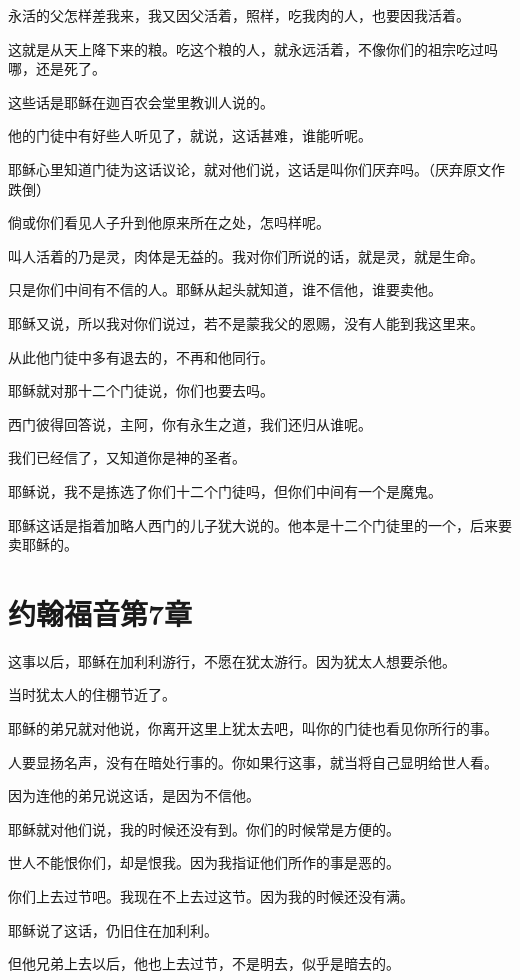 \documentclass[12pt,oneside]{book}
\begin{document}
永活的父怎样差我来，我又因父活着，照样，吃我肉的人，也要因我活着。

这就是从天上降下来的粮。吃这个粮的人，就永远活着，不像你们的祖宗吃过吗哪，还是死了。

这些话是耶稣在迦百农会堂里教训人说的。

他的门徒中有好些人听见了，就说，这话甚难，谁能听呢。

耶稣心里知道门徒为这话议论，就对他们说，这话是叫你们厌弃吗。（厌弃原文作跌倒）

倘或你们看见人子升到他原来所在之处，怎吗样呢。

叫人活着的乃是灵，肉体是无益的。我对你们所说的话，就是灵，就是生命。

只是你们中间有不信的人。耶稣从起头就知道，谁不信他，谁要卖他。

耶稣又说，所以我对你们说过，若不是蒙我父的恩赐，没有人能到我这里来。

从此他门徒中多有退去的，不再和他同行。

耶稣就对那十二个门徒说，你们也要去吗。

西门彼得回答说，主阿，你有永生之道，我们还归从谁呢。

我们已经信了，又知道你是神的圣者。

耶稣说，我不是拣选了你们十二个门徒吗，但你们中间有一个是魔鬼。

耶稣这话是指着加略人西门的儿子犹大说的。他本是十二个门徒里的一个，后来要卖耶稣的。

\chapter{约翰福音第7章}
这事以后，耶稣在加利利游行，不愿在犹太游行。因为犹太人想要杀他。

当时犹太人的住棚节近了。

耶稣的弟兄就对他说，你离开这里上犹太去吧，叫你的门徒也看见你所行的事。

人要显扬名声，没有在暗处行事的。你如果行这事，就当将自己显明给世人看。

因为连他的弟兄说这话，是因为不信他。

耶稣就对他们说，我的时候还没有到。你们的时候常是方便的。

世人不能恨你们，却是恨我。因为我指证他们所作的事是恶的。

你们上去过节吧。我现在不上去过这节。因为我的时候还没有满。

耶稣说了这话，仍旧住在加利利。

但他兄弟上去以后，他也上去过节，不是明去，似乎是暗去的。
\end{document}
